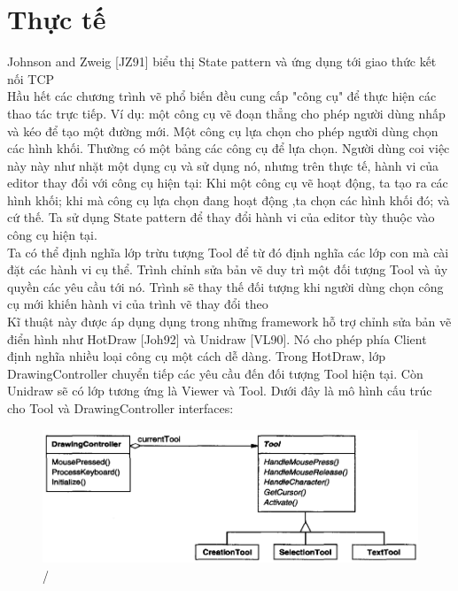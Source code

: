 \section{Thực tế}
Johnson and Zweig [JZ91] biểu thị State pattern và ứng dụng tới giao thức kết nối TCP\\[0.1in]
Hầu hết các chương trình vẽ phổ biến đều cung cấp "công cụ" để thực hiện các thao tác trực tiếp. Ví dụ: một công cụ vẽ đoạn thẳng cho phép người dùng nhấp và kéo để tạo một đường mới. Một công cụ lựa chọn cho phép người dùng chọn các hình khối. Thường có một bảng các công cụ để lựa chọn. Người dùng coi việc này này như nhặt một dụng cụ và sử dụng nó, nhưng trên thực tế, hành vi của editor thay đổi với công cụ hiện tại: Khi một công cụ vẽ hoạt động, ta tạo ra các hình khối; khi mà
công cụ lựa chọn đang hoạt động ,ta chọn các hình khối đó; và cứ thế. Ta sử dụng State pattern để thay đổi hành vi của editor tùy thuộc vào công cụ hiện tại.\\[0.1in]
Ta có thể định nghĩa lớp trừu tượng Tool để từ đó định nghĩa các lớp con mà cài đặt các hành vi cụ thể. Trình chỉnh sửa bản vẽ duy trì một đối tượng Tool và ủy quyền các yêu cầu tới nó. Trình sẽ thay thế đối tượng khi người dùng chọn công cụ mới khiến hành vi của trình vẽ thay đổi theo\\[0.1in]
Kĩ thuật này được áp dụng dụng trong những framework hỗ trợ chỉnh sửa bản vẽ điển hình như HotDraw [Joh92] và Unidraw [VL90]. Nó cho phép phía Client định nghĩa nhiều loại công cụ một cách dễ dàng. Trong HotDraw, lớp DrawingController chuyển tiếp các yêu cầu đến đối tượng Tool hiện tại. Còn Unidraw sẽ có lớp tương ứng là Viewer và Tool. Dưới đây là mô hình cấu trúc cho Tool và DrawingController interfaces:
\begin{figure}[!htb]
    \centering
    \includegraphics[width=\textwidth]{fig/State/StateRealLifeEX.png}/
\end{figure}